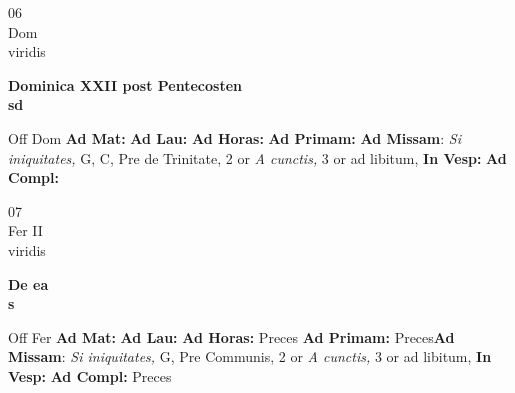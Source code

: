 \documentclass[10pt, openany]{book}
\begin{document}
        \begin{center}
            \begin{minipage}{3.5in}
                \vspace{2em}
                \begin{minipage}{0.5in}
                    {\Huge 06} \\
                    {\normalsize Dom} \\
                    {\normalsize viridis}
                \end{minipage}
                \begin{minipage}{3.0in}
                    \textbf{ \large Dominica XXII post Pentecosten \\
                    \textnormal{\normalsize sd}} \\ 
                \end{minipage}
                \begin{justify}Off Dom
                    \textbf{Ad Mat: }
                    \textbf{Ad Lau: }
                    \textbf{Ad Horas: }
                    \textbf{Ad Primam: }\textbf{Ad Missam}: \textit{Si iniquitates,} G, C, Pre de Trinitate, 2 or \textit{A cunctis,} 3 or ad libitum,  
                    \textbf{In Vesp: }
                    \textbf{Ad Compl: }
                \end{justify}
            \end{minipage}
        \end{center}
    
        \begin{center}
            \begin{minipage}{3.5in}
                \vspace{2em}
                \begin{minipage}{0.5in}
                    {\Huge 07} \\
                    {\normalsize Fer II} \\
                    {\normalsize viridis}
                \end{minipage}
                \begin{minipage}{3.0in}
                    \textbf{ \large De ea \\
                    \textnormal{\normalsize s}} \\ 
                \end{minipage}
                \begin{justify}Off Fer
                    \textbf{Ad Mat: }
                    \textbf{Ad Lau: }
                    \textbf{Ad Horas: }Preces
                    \textbf{Ad Primam: }Preces\textbf{Ad Missam}: \textit{Si iniquitates,} G, Pre Communis, 2 or \textit{A cunctis,} 3 or ad libitum,  
                    \textbf{In Vesp: }
                    \textbf{Ad Compl: }Preces
                \end{justify}
            \end{minipage}
        \end{center}
    
\end{document}
